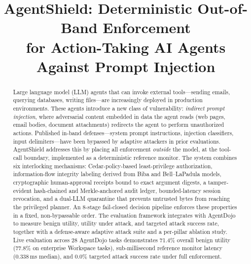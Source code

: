 \documentclass[10pt,conference]{IEEEtran}
\begin{document}
\title{AgentShield: Deterministic Out-of-Band Enforcement\\
for Action-Taking AI Agents Against Prompt Injection}

\author{%
}

\maketitle

\begin{abstract}
Large language model (LLM) agents that can invoke external tools---sending
emails, querying databases, writing files---are increasingly deployed in
production environments. These agents introduce a new class of vulnerability:
\emph{indirect prompt injection}, where adversarial content embedded in data
the agent reads (web pages, email bodies, document attachments) redirects the
agent to perform unauthorized actions. Published in-band defenses---system
prompt instructions, injection classifiers, input delimiters---have been
bypassed by adaptive attackers in prior evaluations. AgentShield addresses
this by placing all enforcement \emph{outside} the model, at the tool-call
boundary, implemented as a deterministic reference monitor. The system combines
six interlocking mechanisms: Cedar-policy-based least-privilege authorization,
information-flow integrity labeling derived from Biba and Bell--LaPadula models,
cryptographic human-approval receipts bound to exact argument digests, a
tamper-evident hash-chained and Merkle-anchored audit ledger, bounded-latency
session revocation, and a dual-LLM quarantine that prevents untrusted bytes from
reaching the privileged planner. An 8-stage fail-closed decision pipeline enforces
these properties in a fixed, non-bypassable order. The evaluation framework
integrates with AgentDojo to measure benign utility, utility under attack, and
targeted attack success rate, together with a defense-aware adaptive attack suite
and a per-pillar ablation study. Live evaluation across 28 AgentDojo tasks
demonstrates 71.4\% overall benign utility (77.8\% on enterprise Workspace tasks),
sub-millisecond reference monitor latency (0.338\,ms median), and 0.0\% targeted
attack success rate under full enforcement.
\end{abstract}
\end{document}
